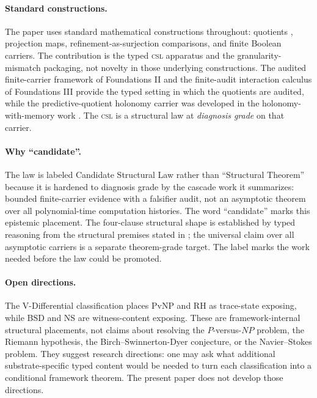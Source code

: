\documentclass[11pt]{article}
\newcommand{\CSL}{\textsc{csl}}            \newcommand{\CSLcore}{Candidate Structural Law}
\newcommand{\DiagnosisGrade}{\emph{diagnosis grade}}
\theoremstyle{definition}
\begin{document}
\paragraph{Standard constructions.}
The paper uses standard mathematical constructions throughout:
quotients \citep{Halmos1960NaiveSetTheory},
projection maps, refinement-as-surjection comparisons, and finite
Boolean carriers.  The contribution is the typed \CSL{}
apparatus and the granularity-mismatch packaging, not novelty in those
underlying constructions.  The audited finite-carrier framework of
Foundations II and the finite-audit interaction calculus of
Foundations III provide the typed setting in which the quotients are
audited, while the predictive-quotient holonomy carrier was developed
in the holonomy-with-memory work
\citep{TsiokosFoundationsII2026,TsiokosFoundationsIII2026,TsiokosHolonomyMemory2026}.
The \CSL{} is a structural law at \DiagnosisGrade{} on that carrier.

\paragraph{Why ``candidate''.}
The law is labeled \CSLcore{} rather than ``Structural Theorem''
because it is hardened to diagnosis grade by the cascade work it
summarizes: bounded finite-carrier evidence with a falsifier audit, not
an asymptotic theorem over all polynomial-time computation histories.
The word ``candidate'' marks this epistemic placement.  The
four-clause structural shape is established by typed reasoning from the
structural premises stated in ; the universal claim
over all asymptotic carriers is a separate theorem-grade target.  The
label marks the work needed before the law could be promoted.

\paragraph{Open directions.}
The V-Differential classification places PvNP and RH as trace-state
exposing, while BSD and NS are witness-content exposing.  These are
framework-internal structural placements, not claims about resolving
the \(P\)-versus-\(NP\) problem, the Riemann hypothesis, the
Birch--Swinnerton-Dyer conjecture, or the Navier--Stokes problem.  They
suggest research directions: one may ask what additional
substrate-specific typed content would be needed to turn each
classification into a conditional framework theorem.  The present
paper does not develop those directions.
\end{document}
